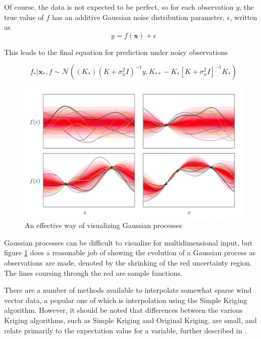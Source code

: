 \documentclass[12pt]{report}
\begin{document}
Of course, the data is not expected to be perfect, so for each observation $y$, the true value of $f$ has an additive Gaussian noise distribution parameter, $\epsilon$, written as 
\begin{equation}
	y = f(\boldsymbol{x})+\epsilon
	\label{eq:Gaussian noise}
\end{equation}

This leads to the final equation for prediction under noisy observations

\begin{equation}
	f_*|\boldsymbol{x_*}, f \sim \mathcal{N}((K_*)(K+\sigma_n^2I)^{-1}y,K_{**}-K_*[K+\sigma_n^2I]^{-1}K_*) 
	\label{eq:Noisy Gaussian observation}
\end{equation}

\begin{figure}[!ht]
	\centering
	\includegraphics[scale=0.3]{Gaussian_Process_Illustration.jpg}
	\caption{An effective way of visualizing Gaussian processes \cite{Duvenaud14}}
	\label{fig:GP_and_Sampling}
\end{figure}
Gaussian processes can be difficult to visualize for multidimensional input, but figure \ref{fig:GP_and_Sampling} does a reasonable job of showing the evolution of a Gaussian process as observations are made, denoted by the shrinking of the red uncertainty region. The lines coursing through the red are sample functions.

There are a number of methods available to interpolate somewhat sparse wind 
vector data, a popular one of which is interpolation using the Simple Kriging algorithm. However, it should be noted that differences between the various Kriging algorithms, such as Simple Kriging and Original Kriging, are small, and relate primarily to the expectation value for a variable, further described in \cite{Liu13}.
\end{document}
